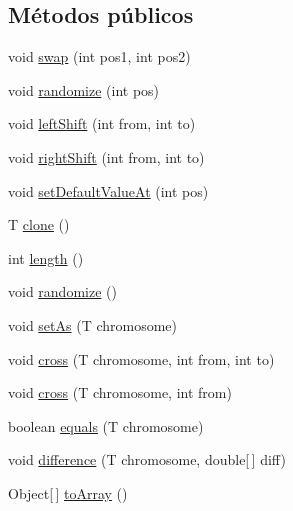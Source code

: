 \subsection*{Métodos públicos}
\begin{DoxyCompactItemize}
\item 
void \hyperlink{interfacejenes_1_1chromosome_1_1_chromosome_3_01_t_01extends_01_chromosome_01_4_ad3a9fc2dbf63e0fb2b486a08ace2a6e8}{swap} (int pos1, int pos2)
\item 
void \hyperlink{interfacejenes_1_1chromosome_1_1_chromosome_3_01_t_01extends_01_chromosome_01_4_a1afc86af7df16d75b9fceaac91b57216}{randomize} (int pos)
\item 
void \hyperlink{interfacejenes_1_1chromosome_1_1_chromosome_3_01_t_01extends_01_chromosome_01_4_ab04d66867a48c5ac9eafe26e0473d326}{left\-Shift} (int from, int to)
\item 
void \hyperlink{interfacejenes_1_1chromosome_1_1_chromosome_3_01_t_01extends_01_chromosome_01_4_a26ee95b79d8c4012acffd9d26ab1b620}{right\-Shift} (int from, int to)
\item 
void \hyperlink{interfacejenes_1_1chromosome_1_1_chromosome_3_01_t_01extends_01_chromosome_01_4_a7da893369a724b9bdde694ffd07e05ef}{set\-Default\-Value\-At} (int pos)
\item 
T \hyperlink{interfacejenes_1_1chromosome_1_1_chromosome_3_01_t_01extends_01_chromosome_01_4_a853c4aaab715bdcc4f89ed84dfbe1f00}{clone} ()
\item 
int \hyperlink{interfacejenes_1_1chromosome_1_1_chromosome_3_01_t_01extends_01_chromosome_01_4_a29f012dd3205c9bdb3fe3b749aa7c927}{length} ()
\item 
void \hyperlink{interfacejenes_1_1chromosome_1_1_chromosome_3_01_t_01extends_01_chromosome_01_4_ab54ea692387c9a052c6e47191f02f600}{randomize} ()
\item 
void \hyperlink{interfacejenes_1_1chromosome_1_1_chromosome_3_01_t_01extends_01_chromosome_01_4_a07cb1cba99dd05811c5f5530ffc0642e}{set\-As} (T chromosome)
\item 
void \hyperlink{interfacejenes_1_1chromosome_1_1_chromosome_3_01_t_01extends_01_chromosome_01_4_a3865a9034e0582dc11b6dc6cbd9b21da}{cross} (T chromosome, int from, int to)
\item 
void \hyperlink{interfacejenes_1_1chromosome_1_1_chromosome_3_01_t_01extends_01_chromosome_01_4_a56f3d45ef9dced649f9050d736e6e753}{cross} (T chromosome, int from)
\item 
boolean \hyperlink{interfacejenes_1_1chromosome_1_1_chromosome_3_01_t_01extends_01_chromosome_01_4_afa9dc889ff75457240750c802a5024db}{equals} (T chromosome)
\item 
void \hyperlink{interfacejenes_1_1chromosome_1_1_chromosome_3_01_t_01extends_01_chromosome_01_4_a7f4ba26864bc54607635b608be6a1e1d}{difference} (T chromosome, double\mbox{[}$\,$\mbox{]} diff)
\item 
Object\mbox{[}$\,$\mbox{]} \hyperlink{interfacejenes_1_1chromosome_1_1_chromosome_3_01_t_01extends_01_chromosome_01_4_aaf3edb9b3b7265edf5e754ca2b41603e}{to\-Array} ()
\end{DoxyCompactItemize}


